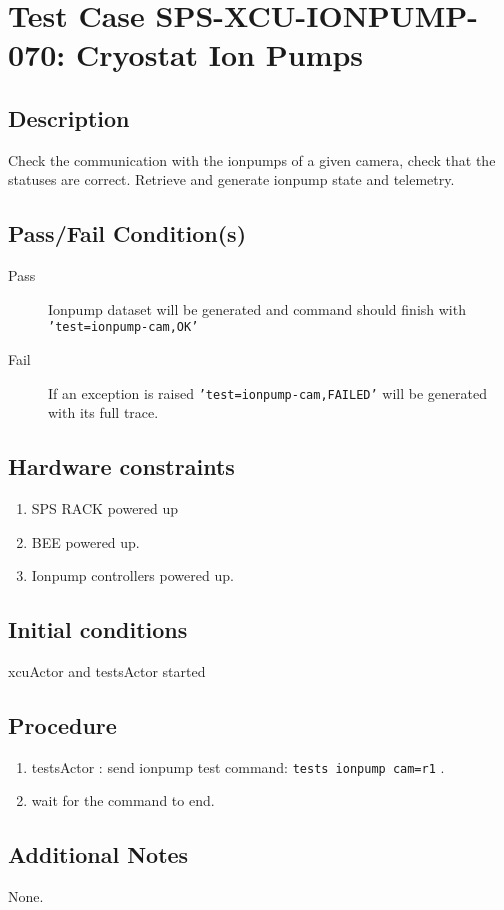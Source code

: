 \section{Test Case SPS-XCU-IONPUMP-070: Cryostat Ion Pumps}

\subsection{Description}

Check the communication with the ionpumps of a given camera, check that the statuses are correct.
Retrieve and generate ionpump state and telemetry.

\subsection{Pass/Fail Condition(s)}

\begin{description}
\item [Pass] Ionpump dataset will be generated and command should finish with \texttt{'test=ionpump-cam,OK'}
\item [Fail] If an exception is raised \texttt{'test=ionpump-cam,FAILED'} will be generated with its full trace.

\end{description}

\subsection{Hardware constraints}

\begin{enumerate}
    \item SPS RACK powered up
    \item BEE powered up.
    \item Ionpump controllers powered up.
\end{enumerate}

\subsection{Initial conditions}

xcuActor and testsActor started

\subsection{Procedure}

\begin{enumerate}
    \item testsActor : send ionpump test command: \texttt{tests ionpump cam=r1} .
    \item wait for the command to end.
\end{enumerate}

\subsection{Additional Notes}
None.
